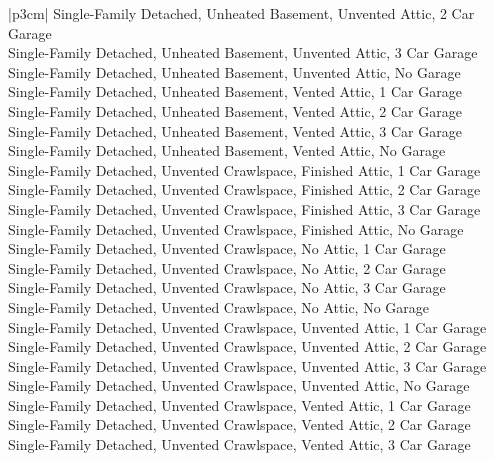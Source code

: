 \begin{customLongTable}{ |p{3cm}| }
Single-Family Detached, Unheated Basement, Unvented Attic, 2 Car Garage \\ \hline
Single-Family Detached, Unheated Basement, Unvented Attic, 3 Car Garage \\ \hline
Single-Family Detached, Unheated Basement, Unvented Attic, No Garage \\ \hline
Single-Family Detached, Unheated Basement, Vented Attic, 1 Car Garage \\ \hline
Single-Family Detached, Unheated Basement, Vented Attic, 2 Car Garage \\ \hline
Single-Family Detached, Unheated Basement, Vented Attic, 3 Car Garage \\ \hline
Single-Family Detached, Unheated Basement, Vented Attic, No Garage \\ \hline
Single-Family Detached, Unvented Crawlspace, Finished Attic, 1 Car Garage \\ \hline
Single-Family Detached, Unvented Crawlspace, Finished Attic, 2 Car Garage \\ \hline
Single-Family Detached, Unvented Crawlspace, Finished Attic, 3 Car Garage \\ \hline
Single-Family Detached, Unvented Crawlspace, Finished Attic, No Garage \\ \hline
Single-Family Detached, Unvented Crawlspace, No Attic, 1 Car Garage \\ \hline
Single-Family Detached, Unvented Crawlspace, No Attic, 2 Car Garage \\ \hline
Single-Family Detached, Unvented Crawlspace, No Attic, 3 Car Garage \\ \hline
Single-Family Detached, Unvented Crawlspace, No Attic, No Garage \\ \hline
Single-Family Detached, Unvented Crawlspace, Unvented Attic, 1 Car Garage \\ \hline
Single-Family Detached, Unvented Crawlspace, Unvented Attic, 2 Car Garage \\ \hline
Single-Family Detached, Unvented Crawlspace, Unvented Attic, 3 Car Garage \\ \hline
Single-Family Detached, Unvented Crawlspace, Unvented Attic, No Garage \\ \hline
Single-Family Detached, Unvented Crawlspace, Vented Attic, 1 Car Garage \\ \hline
Single-Family Detached, Unvented Crawlspace, Vented Attic, 2 Car Garage \\ \hline
Single-Family Detached, Unvented Crawlspace, Vented Attic, 3 Car Garage \\ \hline

\end{customLongTable}
